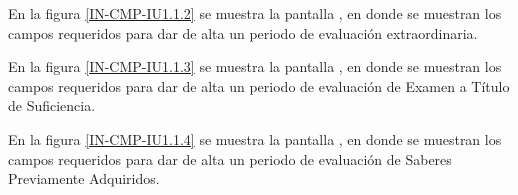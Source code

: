 	En la figura \ref{IN-CMP-IU1.1.2} se muestra la pantalla , en donde se muestran los campos requeridos para dar de alta un periodo de evaluación extraordinaria.\\
	
    
	En la figura \ref{IN-CMP-IU1.1.3} se muestra la pantalla , en donde se muestran los campos requeridos para dar de alta un periodo de evaluación de Examen a Título de Suficiencia.\\
	
	
	En la figura \ref{IN-CMP-IU1.1.4} se muestra la pantalla , en donde se muestran los campos requeridos para dar de alta un periodo de evaluación de Saberes Previamente Adquiridos.\\

